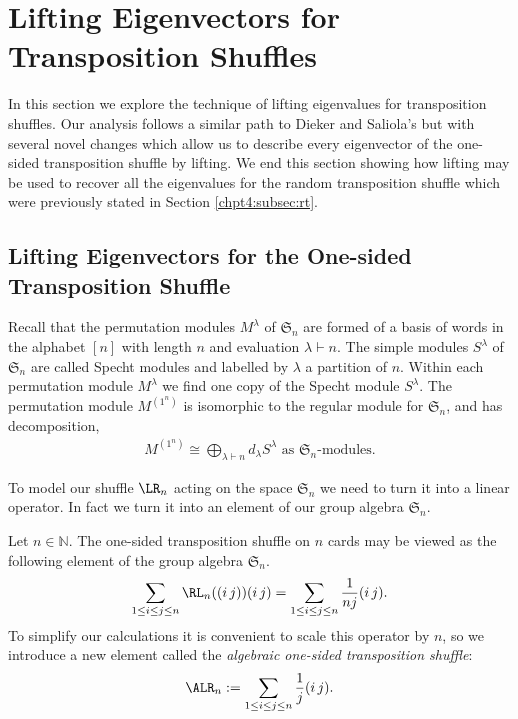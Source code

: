 \documentclass[11pt]{report}
\begin{document}
\section{Lifting Eigenvectors for Transposition Shuffles}
\label{chpt5:sec:algebra}

In this section we explore the technique of lifting eigenvalues for transposition shuffles. 
Our analysis follows a similar path to Dieker and Saliola's but with several novel changes which allow us to describe every eigenvector of the one-sided transposition shuffle by lifting.
We end this section showing how lifting may be used to recover all the eigenvalues for the random transposition shuffle which were previously stated in Section \ref{chpt4:subsec:rt}.

\subsection{Lifting Eigenvectors for the One-sided Transposition Shuffle}
\label{chpt5:subsec:algebra}


Recall that the permutation modules $M^{\lambda}$ of $\mathfrak{S}_{n}$ are 
formed of a basis of words in the alphabet $[n]$ with length $n$ and evaluation 
$\lambda \vdash n$. The simple modules $S^{\lambda}$ of 
$\mathfrak{S}_{n}$ are 	called Specht modules and labelled by $\lambda$ a 
partition of $n$.  Within each permutation module $M^{\lambda}$ we find one 
copy of the Specht module $S^{\lambda}$. The 
permutation module $M^{(1^{n})}$ is isomorphic to the regular module for 
$\mathfrak{S}_{n}$, and has decomposition,
\begin{eqnarray}
M^{(1^{n})} \cong \bigoplus_{\lambda \vdash n} d_{\lambda} 
S^{\lambda}  \text{ as $\mathfrak{S}_{n}$-modules}. \label{chpt5:eqn:classiciso}
\end{eqnarray}


To model our shuffle $\LR_{n}$ acting on the space $\mathfrak{S}_{n}$ 
we need to turn it into a linear operator. In fact we turn it into an 
element of our group algebra $\mathfrak{S}_{n}$.

\begin{defn}
	\label{RLop}
	Let $n \in \mathbb{N}$.
	The one-sided transposition shuffle on $n$ cards may be viewed as the 
	following element of the group algebra $\mathfrak{S}_n$.
	\[\sum_{1 \leq i \leq j \leq n}\RL_{n}((i\,j))  (i\,j)= \sum_{1 \leq i 
		\leq j 
		\leq n}\frac{1}{nj} (i\,j)  .\]
	To simplify our calculations it is convenient to scale this operator by 
	$n$, so we introduce a new element called the \emph{algebraic one-sided transposition shuffle}: 
	\begin{eqnarray}
	\ALR_n:= \sum_{1 \leq i \leq j \leq n}\frac{1}{j} (i\,j) . 
	\label{chpt5:eqn:algebrashuffle}
	\end{eqnarray}
	
\end{defn}
\end{document}
